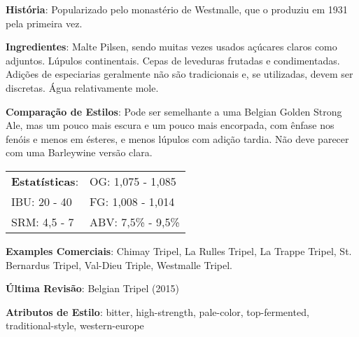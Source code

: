 \textbf{História}: Popularizado pelo monastério de Westmalle, que o produziu em 1931 pela primeira vez.

\textbf{Ingredientes}: Malte Pilsen, sendo muitas vezes usados açúcares claros como adjuntos. Lúpulos continentais. Cepas de leveduras frutadas e condimentadas. Adições de especiarias geralmente não são tradicionais e, se utilizadas, devem ser discretas. Água relativamente mole.

\textbf{Comparação de Estilos}: Pode ser semelhante a uma Belgian Golden Strong Ale, mas um pouco mais escura e um pouco mais encorpada, com ênfase nos fenóis e menos em ésteres, e menos lúpulos com adição tardia. Não deve parecer com uma Barleywine versão clara.

\begin{tabular}{@{}p{35mm}p{35mm}@{}}
  \textbf{Estatísticas}: & OG: 1,075 - 1,085 \\
  IBU: 20 - 40  & FG: 1,008 - 1,014  \\
  SRM: 4,5 - 7  & ABV: 7,5\% - 9,5\%
\end{tabular}

\textbf{Examples Comerciais}: Chimay Tripel, La Rulles Tripel, La Trappe Tripel, St. Bernardus Tripel, Val-Dieu Triple, Westmalle Tripel.

\textbf{Última Revisão}: Belgian Tripel (2015)

\textbf{Atributos de Estilo}: bitter, high-strength, pale-color, top-fermented, traditional-style, western-europe
